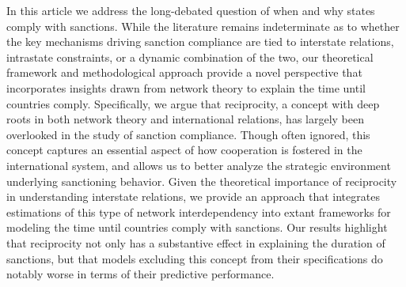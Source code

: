 In this article we address the long-debated question of when and why states comply with sanctions. While the literature remains indeterminate as to whether the key mechanisms driving sanction compliance are tied to interstate relations, intrastate constraints, or a dynamic combination of the two, our theoretical framework and methodological approach provide a novel perspective that incorporates insights drawn from network theory to explain the time until countries comply. Specifically, we argue that reciprocity, a concept with deep roots in both network theory and international relations, has largely been overlooked in the study of sanction compliance. Though often ignored, this concept captures an essential aspect of how cooperation is fostered in the international system, and allows us to better analyze the strategic environment underlying sanctioning behavior. Given the theoretical importance of reciprocity in understanding interstate relations, we provide an approach that integrates estimations of this type of network interdependency into extant frameworks for modeling the time until countries comply with sanctions. Our results highlight that reciprocity not only has a substantive effect in explaining the duration of sanctions, but that models excluding this concept from their specifications do notably worse in terms of their predictive performance.

